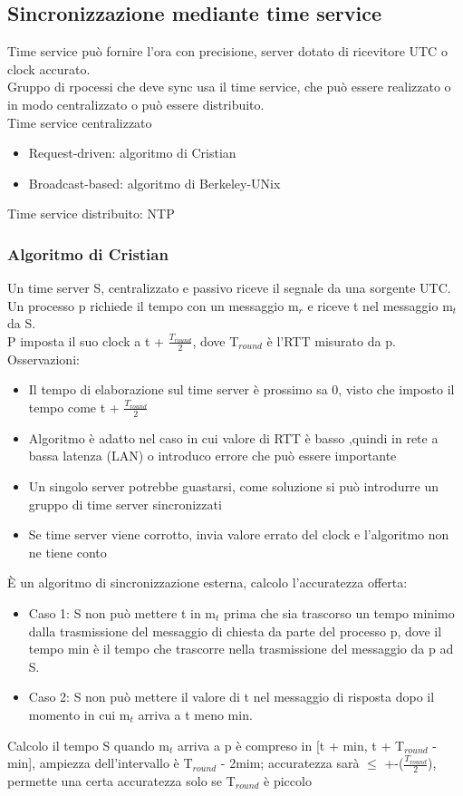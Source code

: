 \documentclass{article}
\begin{document}
\subsection{Sincronizzazione mediante time service}
Time service può fornire l'ora con precisione, server dotato di ricevitore UTC o clock accurato.\\ Gruppo di rpocessi che deve sync usa il time service, che può essere realizzato o in modo centralizzato o può essere distribuito.\\ Time service centralizzato
\begin{itemize}
\item Request-driven: algoritmo di Cristian
\item Broadcast-based: algoritmo di Berkeley-UNix
\end{itemize}
Time service distribuito: NTP
\subsubsection{Algoritmo di Cristian} 
Un time server S, centralizzato e passivo riceve il segnale da una sorgente UTC. Un processo p richiede il tempo con un messaggio m$_r$ e riceve t nel messaggio m$_t$ da S.\\ P imposta il suo clock a t + $\frac{T_{round}}{2}$, dove T$_{round}$ è l'RTT misurato da p. Osservazioni:
\begin{itemize}
\item Il tempo di elaborazione sul time server è prossimo sa 0, visto che imposto il tempo come t + $\frac{T_{round}}{2}$
\item Algoritmo è adatto nel caso in cui valore di RTT è basso ,quindi in rete a bassa latenza (LAN) o introduco errore che può essere importante
\item Un singolo server potrebbe guastarsi, come soluzione si può introdurre un gruppo di time server sincronizzati
\item Se time server viene corrotto, invia valore errato del clock e l'algoritmo non ne tiene conto
\end{itemize} È un algoritmo di sincronizzazione esterna, calcolo l'accuratezza offerta:
\begin{itemize}
\item Caso 1: S non può mettere t in m$_t$ prima che sia trascorso un tempo minimo dalla trasmissione del messaggio di chiesta da parte del processo p, dove il tempo min è il tempo che trascorre nella trasmissione del messaggio da p ad S.
\item Caso 2: S non può mettere il valore di t nel messaggio di risposta dopo il momento in cui m$_t$ arriva a t meno min.
\end{itemize}
Calcolo il tempo S quando m$_t$ arriva a p è compreso in [t + min, t + T$_{round}$ - min], ampiezza dell'intervallo è  T$_{round}$ - 2mim; accuratezza sarà $\leq$ +-($\frac{T_{round}}{2}$), permette una certa accuratezza solo se T$_{round}$ è piccolo
\end{document}
